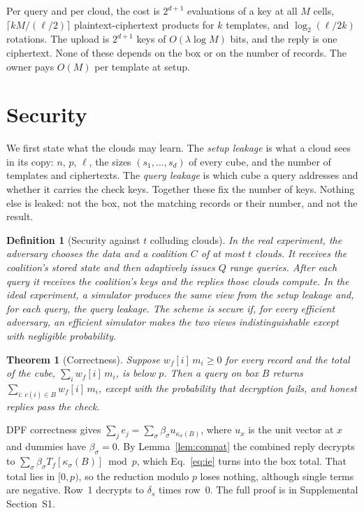 \documentclass[10pt,journal,compsoc]{IEEEtran}
\newtheorem{theorem}{Theorem}
\newtheorem{definition}{Definition}
\begin{document}
Per query and per cloud, the cost is $2^{d+1}$ evaluations of a key at all $M$
cells, $\lceil kM/(\ell/2)\rceil$ plaintext-ciphertext products for $k$
templates, and $\log_2(\ell/2k)$ rotations. The upload is $2^{d+1}$ keys of
$O(\lambda\log M)$ bits, and the reply is one ciphertext. None of these depends
on the box or on the number of records. The owner pays $O(M)$ per template at
setup.

\section{Security}
\label{sec:security}

We first state what the clouds may learn. The \emph{setup leakage} is what a
cloud sees in its copy: $n$, $p$, $\ell$, the sizes $(s_1,\dots,s_d)$ of every
cube, and the number of templates and ciphertexts. The \emph{query leakage} is
which cube a query addresses and whether it carries the check keys. Together
these fix the number of keys. Nothing else is leaked: not the box, not the
matching records or their number, and not the result.

\begin{definition}[Security against $t$ colluding clouds]
\label{def:sec}
In the real experiment, the adversary chooses the data and a coalition $C$ of
at most $t$ clouds. It receives the coalition's stored state and then
adaptively issues $Q$ range queries. After each query it receives the
coalition's keys and the replies those clouds compute. In the ideal
experiment, a simulator produces the same view from the setup leakage and, for
each query, the query leakage. The scheme is secure if, for every efficient
adversary, an efficient simulator makes the two views indistinguishable except
with negligible probability.
\end{definition}

\begin{theorem}[Correctness]
\label{thm:correct}
Suppose $w_f[i]\,m_i\ge0$ for every record and the total of the cube,
$\sum_iw_f[i]\,m_i$, is below $p$. Then a query on box $B$ returns
$\sum_{i:\,c(i)\in B}w_f[i]\,m_i$, except with the probability that decryption
fails, and honest replies pass the check.
\end{theorem}
\begin{IEEEproof}
DPF correctness gives
$\sum_je_j=\sum_\sigma\beta_\sigma u_{\kappa_\sigma(B)}$, where $u_x$ is the
unit vector at $x$ and dummies have $\beta_\sigma=0$. By
Lemma~\ref{lem:compat} the combined reply decrypts to
$\sum_\sigma\beta_\sigma T_f[\kappa_\sigma(B)]\bmod p$, which
Eq.~\eqref{eq:ie} turns into the box total. That total lies in $[0,p)$, so the
reduction modulo $p$ loses nothing, although single terms are negative. Row~1
decrypts to $\delta_s$ times row~0. The full proof is in Supplemental
Section~S1.
\end{IEEEproof}
\end{document}
